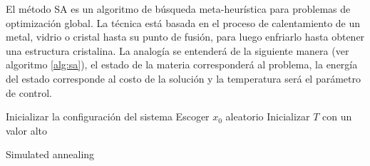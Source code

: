 El método SA es un algoritmo de búsqueda meta-heurística para problemas de optimización global. La técnica está basada en el proceso de calentamiento de un metal, vidrio o cristal hasta su punto de fusión, para luego enfriarlo hasta obtener una estructura cristalina. La analogía se entenderá de la siguiente manera (ver algoritmo \ref{alg:sa}), el estado de la materia corresponderá al problema, la energía del estado corresponde al costo de la solución y la temperatura será el parámetro de control.

\begin{algorithm}[H]
    \SetAlgoLined
	Inicializar la configuración del sistema\;
	Escoger $x_{0}$ aleatorio\;
	Inicializar $T$ con un valor alto\;
	\caption{Simulated annealing}
	\label{alg:sa}
\end{algorithm}



